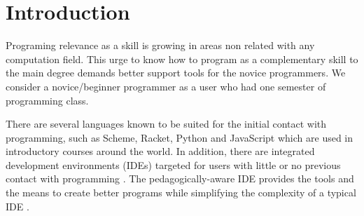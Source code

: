 \section{Introduction}




Programing relevance as a skill is growing in areas non related with any computation field.  %
This urge to know how to program as a complementary skill %
to the main degree demands better support tools for the novice programmers. %
We consider a novice/beginner programmer as a user who had one semester of programming class. %


There are several languages known to be suited for the initial contact %
with programming, such as Scheme, Racket, Python and JavaScript which are used in introductory
courses around the world.
In addition, there are integrated development environments (IDEs) targeted for
 users with little or no previous contact with programming \cite{kolling2003bluej}. %
The pedagogically-aware %
 IDE provides the tools and the means to create better programs while simplifying
the complexity of a typical IDE \cite{pears2007survey}.%

